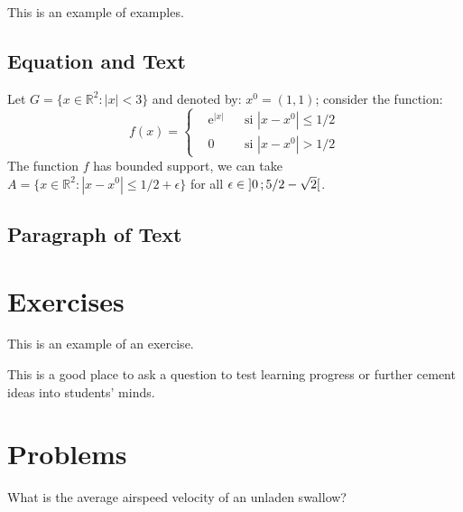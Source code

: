 \documentclass[11pt,fleqn]{book} %
\begin{document}
This is an example of examples.

\subsection{Equation and Text}

\begin{example}
Let $G=\{x\in\mathbb{R}^2:|x|<3\}$ and denoted by: $x^0=(1,1)$; consider the function:
\begin{equation}
f(x)=\left\{\begin{aligned} & \mathrm{e}^{|x|} & & \text{si $|x-x^0|\leq 1/2$}\\
& 0 & & \text{si $|x-x^0|> 1/2$}\end{aligned}\right.
\end{equation}
The function $f$ has bounded support, we can take $A=\{x\in\mathbb{R}^2:|x-x^0|\leq 1/2+\epsilon\}$ for all $\epsilon\in\mathopen{]}0\,;5/2-\sqrt{2}\mathclose{[}$.
\end{example}

\subsection{Paragraph of Text}

\begin{example}
\lipsum[2]
\end{example}


\section{Exercises} %

This is an example of an exercise.

\begin{exercise}[Exercicios]
This is a good place to ask a question to test learning progress or further cement ideas into students' minds.
\end{exercise}


\section{Problems}

\begin{problem}
What is the average airspeed velocity of an unladen swallow?
\end{problem}
\end{document}
